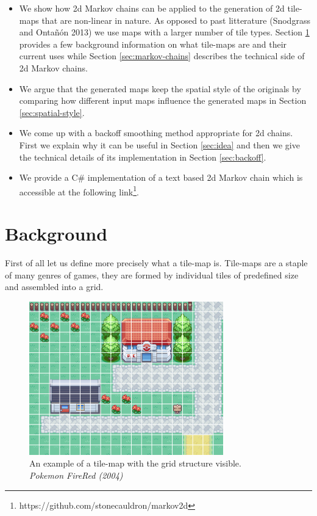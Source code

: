 \documentclass[A4paper,]{article}
\begin{document}
\begin{itemize}
\item
  We show how 2d Markov chains can be applied to the generation of 2d
  tile-maps that are non-linear in nature. As opposed to past
  litterature (Snodgrass and Ontañón 2013) we use maps with a larger
  number of tile types. Section \ref{sec:background} provides a few
  background information on what tile-maps are and their current uses
  while Section \ref{sec:markov-chains} describes the technical side of
  2d Markov chains.
\item
  We argue that the generated maps keep the spatial style of the
  originals by comparing how different input maps influence the
  generated maps in Section \ref{sec:spatial-style}.
\item
  We come up with a backoff smoothing method appropriate for 2d chains.
  First we explain why it can be useful in Section \ref{sec:idea} and
  then we give the technical details of its implementation in Section
  \ref{sec:backoff}.
\item
  We provide a C\# implementation of a text based 2d Markov chain which
  is accessible at the following link\footnote{https://github.com/stonecauldron/markov2d}.
\end{itemize}

\section{Background}\label{sec:background}

First of all let us define more precisely what a tile-map is. Tile-maps
are a staple of many genres of games, they are formed by individual
tiles of predefined size and assembled into a grid.

\begin{figure}
\centering
\includegraphics[width=0.75000\textwidth]{img/tile-map-example.png}
\caption{An example of a tile-map with the grid structure visible.\\
\emph{Pokemon FireRed (2004)}}
\end{figure}
\end{document}
